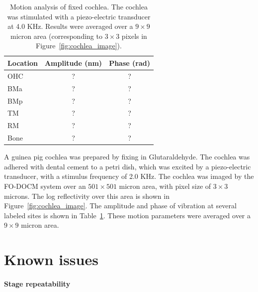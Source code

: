 \begin{table}[h!]
\centering
\begin{tabular}{l | c c}
Location & Amplitude (nm) & Phase (rad) \\ \hline
OHC & ? & ? \\
BMa & ? & ? \\
BMp & ? & ? \\
TM & ? & ? \\
RM & ? & ? \\
Bone & ? & ? \\
\end{tabular}
\caption[Motion analysis of fixed cochlea.]{Motion analysis of fixed cochlea. The cochlea was stimulated with a piezo-electric transducer at 4.0 KHz. Results were averaged over a $9 \times 9$ micron area (corresponding to $3 \times 3$ pixels in Figure~\ref{fig:cochlea_image}). \label{tab:cochlea_vib}}
\end{table}

A guinea pig cochlea was prepared by fixing in Glutaraldehyde. The cochlea was adhered with dental cement to a petri dish, which was excited by a piezo-electric transducer, with a stimulus frequency of 2.0 KHz. The cochlea was imaged by the FO-DOCM system over an $501 \times 501$ micron area, with pixel size of $3 \times 3$ microns. The log reflectivity over this area is shown in Figure~\ref{fig:cochlea_image}. The amplitude and phase of vibration at several labeled sites is shown in Table~\ref{tab:cochlea_vib}. These motion parameters were averaged over a $9 \times 9$ micron area.

\section{Known issues}
\label{sec:known_issues}



\paragraph{Stage repeatability}

